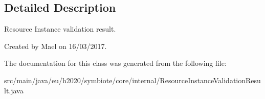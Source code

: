 \subsection{Detailed Description}
Resource Instance validation result.

Created by Mael on 16/03/2017. 

The documentation for this class was generated from the following file\+:\begin{DoxyCompactItemize}
\item 
src/main/java/eu/h2020/symbiote/core/internal/Resource\+Instance\+Validation\+Result.\+java\end{DoxyCompactItemize}
